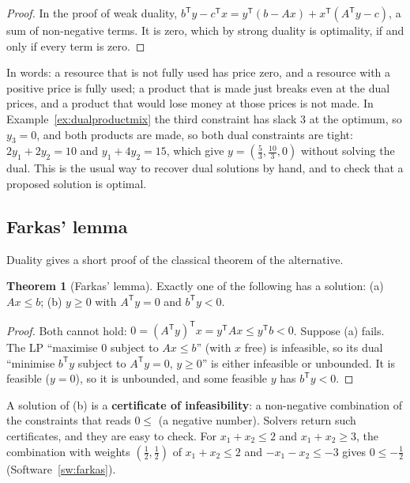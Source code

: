 \documentclass[11pt,a4paper]{article}
\numberwithin{equation}{section}
\theoremstyle{definition}
\newtheorem{thm}{Theorem}[subsection]
\begin{document}
\begin{proof}
In the proof of weak duality, $b^{\mathsf T}y - c^{\mathsf T}x = y^{\mathsf T}(b - Ax) + x^{\mathsf T}(A^{\mathsf T}y - c)$, a sum of non-negative terms. It is zero, which by strong duality is optimality, if and only if every term is zero.
\end{proof}

In words: a resource that is not fully used has price zero, and a resource with a positive price is fully used; a product that is made just breaks even at the dual prices, and a product that would lose money at those prices is not made. In Example~\ref{ex:dualproductmix} the third constraint has slack $3$ at the optimum,
so $y_3 = 0$, and both products are made, so both dual constraints are tight: $2y_1 + 2y_2 = 10$ and $y_1 + 4y_2 = 15$, which give $y = (\frac53, \frac{10}3, 0)$ without solving the dual. This is the usual way to recover dual solutions by hand, and to check that a proposed solution is optimal.

\subsection{Farkas' lemma}
\label{ssec:farkas}

Duality gives a short proof of the classical theorem of the alternative.

\begin{thm}[Farkas' lemma]
\label{thm:farkas}
Exactly one of the following has a solution: (a) $Ax \leq b$; (b) $y \geq 0$ with $A^{\mathsf T}y = 0$ and $b^{\mathsf T}y < 0$.
\end{thm}

\begin{proof}
Both cannot hold: $0 = (A^{\mathsf T}y)^{\mathsf T}x = y^{\mathsf T}Ax \leq y^{\mathsf T}b < 0$. Suppose (a) fails. The LP ``maximise $0$ subject to $Ax \leq b$'' (with $x$ free) is infeasible, so its dual ``minimise $b^{\mathsf T}y$ subject to $A^{\mathsf T}y = 0$, $y \geq 0$'' is either infeasible or unbounded. It is
feasible ($y = 0$), so it is unbounded, and some feasible $y$ has $b^{\mathsf T}y < 0$.
\end{proof}

A solution of (b) is a \textbf{certificate of infeasibility}: a non-negative combination of the constraints that reads $0 \leq$ (a negative number). Solvers return such certificates, and they are easy to check. For $x_1 + x_2 \leq 2$ and $x_1 + x_2 \geq 3$, the combination with weights $(\frac12, \frac12)$ of $x_1 + x_2 \leq 2$
and $-x_1 - x_2 \leq -3$ gives $0 \leq -\frac12$ (Software~\ref{sw:farkas}).
\end{document}
